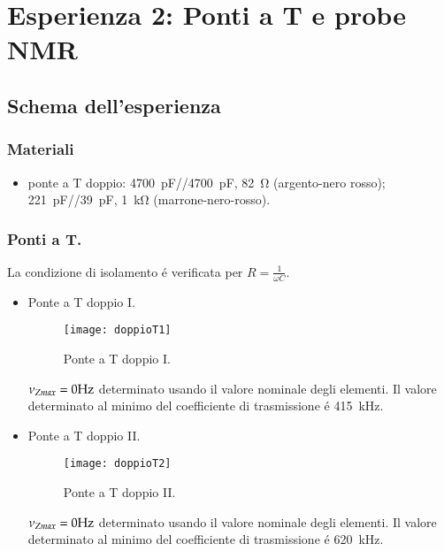 \documentclass[main.tex]{subfiles}
\begin{document}

\chapter{Esperienza 2: Ponti a T e probe NMR}

\section{Schema dell'esperienza}

\subsection{Materiali}

\begin{itemize}
\item ponte a T doppio: \SI{4700}{\pico\farad}//\SI{4700}{\pico\farad}, \SI{82}{\ohm} (argento-nero rosso); \SI{221}{\pico\farad}//\SI{39}{\pico\farad}, \SI{1}{\kilo\ohm} (marrone-nero-rosso).
\end{itemize}

\subsection{Ponti a T.}
La condizione di isolamento \'e verificata per $R=\frac{1}{\omega C}$.
\begin{itemize}
\item Ponte a T doppio I.
\begin{figure}[!ht]\centering\texttt{[image: doppioT1]}\caption{Ponte a T doppio I.}\label{fig:T1}\end{figure}
\edef\RT{82}   %
\edef\CT{4700*(10)^(-12)}   %
$\nu_{Zmax}=\pgfmathparse{((\CT*\RT)^(-1))/(2*pi)}\pgfmathprintnumber{\pgfmathresult}\si{\hertz}$ determinato usando il valore nominale degli elementi. Il valore determinato al minimo del coefficiente di trasmissione \'e \SI{415}{\kilo\hertz}.

\item Ponte a T doppio II.
\begin{figure}[!ht]\centering\texttt{[image: doppioT2]}\caption{Ponte a T doppio II.}\label{fig:T2}\end{figure}
\edef\RT{1000}   %
\edef\CT{(39+221)*10^(-12)}   %
$\nu_{Zmax}=\pgfmathparse{((\CT*\RT)^(-1))/(2*pi)}\pgfmathprintnumber{\pgfmathresult}\si{\hertz}$ determinato usando il valore nominale degli elementi. Il valore determinato al minimo del coefficiente di trasmissione \'e \SI{620}{\kilo\hertz}.

\end{itemize}
\end{document}
